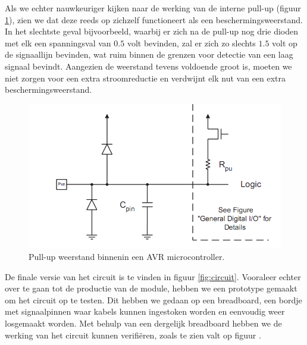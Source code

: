 Als we echter nauwkeuriger kijken naar de werking van de interne pull-up (figuur \ref{fig:avr_pullup}), zien we dat deze reeds op zichzelf functioneert als een beschermingsweerstand. In het slechtste geval bijvoorbeeld, waarbij er zich na de pull-up nog drie dioden met elk een spanningsval van $0.5$ volt bevinden, zal er zich zo slechts $1.5$ volt op de signaallijn bevinden, wat ruim binnen de grenzen voor detectie van een laag signaal bevindt. Aangezien de weerstand tevens voldoende groot is, moeten we niet zorgen voor een extra stroomreductie en verdwijnt elk nut van een extra beschermingsweerstand.

\begin{figure}
	\includegraphics[width=\textwidth]{afbeeldingen/inputmodule_pullup}
	\caption{Pull-up weerstand binnenin een AVR microcontroller.}
	\label{fig:avr_pullup}
\end{figure}

De finale versie van het circuit is te vinden in figuur \ref{fig:circuit}. Vooraleer echter over te gaan tot de productie van de module, hebben we een prototype gemaakt om het circuit op te testen. Dit hebben we gedaan op een breadboard, een bordje met signaalpinnen waar kabels kunnen ingestoken worden en eenvoudig weer losgemaakt worden. Met behulp van een dergelijk breadboard hebben we de werking van het circuit kunnen verifiëren, zoals te zien valt op figuur \label{fig:breadboard}.

